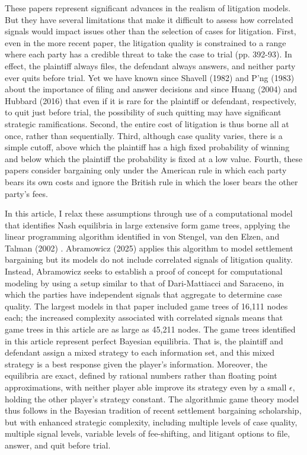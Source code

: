 \documentclass{article}
\begin{document}
These papers represent significant advances in the realism of litigation models. But they have several limitations that make it difficult to assess how correlated signals would impact issues other than the selection of cases for litigation. First, even in the more recent paper, the litigation quality is constrained to a range where each party has a credible threat to take the case to trial (pp. 392-93). In effect, the plaintiff always files, the defendant always answers, and neither party ever quits before trial. Yet we have known since Shavell (1982) and P'ng (1983) about the importance of filing and answer decisions and since Huang (2004) \cite{huang} and Hubbard (2016) \cite{hubbard} that even if it is rare for the plaintiff or defendant, respectively, to quit just before trial, the possibility of such quitting may have significant strategic ramifications. Second, the entire cost of litigation is thus borne all at once, rather than sequentially. Third, although case quality varies, there is a simple cutoff, above which the plaintiff has a high fixed probability of winning and below which the plaintiff the probability is fixed at a low value. Fourth, these papers consider bargaining only under the American rule in which each party bears its own costs and ignore the British rule in which the loser bears the other party's fees. 

In this article, I relax these assumptions through use of a computational model that identifies Nash equilibria in large extensive form game trees, applying the linear programming algorithm identified in von Stengel, van den Elzen, and Talman (2002) \cite{vonstengelvandenelzentalman}. Abramowicz (2025) applies this algorithm to model settlement bargaining but its models do not include correlated signals of litigation quality. Instead, Abramowicz seeks to establish a proof of concept for computational modeling by using a setup similar to that of Dari-Mattiacci and Saraceno, in which the parties have independent signals that aggregate to determine case quality. The largest models in that paper included game trees of 16,111 nodes each; the increased complexity associated with correlated signals means that game trees in this article are as large as 45,211 nodes. The game trees identified in this article represent perfect Bayesian equilibria. That is, the plaintiff and defendant assign a mixed strategy to each information set, and this mixed strategy is a best response given the player's information. Moreover, the equilibria are exact, defined by rational numbers rather than floating point approximations, with neither player able improve its strategy even by a small $\epsilon$, holding the other player's strategy constant. The algorithmic game theory model thus follows in the Bayesian tradition of recent settlement bargaining scholarship, but with enhanced strategic complexity, including multiple levels of case quality, multiple signal levels, variable levels of fee-shifting, and litigant options to file, answer, and quit before trial. 
\end{document}
